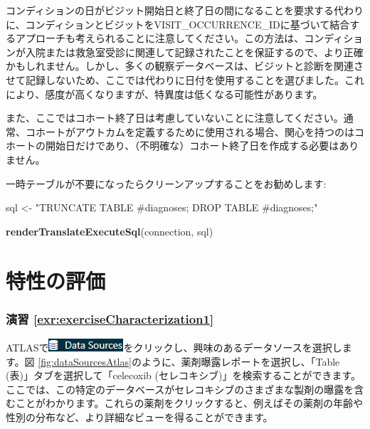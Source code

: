 \documentclass[
  11pt]{book}
\newenvironment{Shaded}{\begin{snugshade}}{\end{snugshade}}
\newcommand{\FunctionTok}[1]{\textcolor[rgb]{0.13,0.29,0.53}{\textbf{#1}}}
\newcommand{\NormalTok}[1]{#1}
\newcommand{\OtherTok}[1]{\textcolor[rgb]{0.56,0.35,0.01}{#1}}
\newcommand{\StringTok}[1]{\textcolor[rgb]{0.31,0.60,0.02}{#1}}
\theoremstyle{definition}
\theoremstyle{definition}
\theoremstyle{definition}
\theoremstyle{definition}
\theoremstyle{remark}
\begin{document}
コンディションの日がビジット開始日と終了日の間になることを要求する代わりに、コンディションとビジットをVISIT\_OCCURRENCE\_IDに基づいて結合するアプローチも考えられることに注意してください。この方法は、コンディションが入院または救急室受診に関連して記録されたことを保証するので、より正確かもしれません。しかし、多くの観察データベースは、ビジットと診断を関連させて記録しないため、ここでは代わりに日付を使用することを選びました。これにより、感度が高くなりますが、特異度は低くなる可能性があります。

また、ここではコホート終了日は考慮していないことに注意してください。通常、コホートがアウトカムを定義するために使用される場合、関心を持つのはコホートの開始日だけであり、（不明確な）コホート終了日を作成する必要はありません。

一時テーブルが不要になったらクリーンアップすることをお勧めします:

\begin{Shaded}
\begin{Highlighting}[]
\NormalTok{sql }\OtherTok{\textless{}{-}} \StringTok{"TRUNCATE TABLE \#diagnoses;}
\StringTok{DROP TABLE \#diagnoses;"}

\FunctionTok{renderTranslateExecuteSql}\NormalTok{(connection, sql)}
\end{Highlighting}
\end{Shaded}

\section{特性の評価}\label{Characterizationanswers}

\subsubsection*{演習 \ref{exr:exerciseCharacterization1}}\label{ux6f14ux7fd2-refexrexercisecharacterization1}

ATLASで\includegraphics{images/Characterization/atlasDataSourcesMenuItem.png}をクリックし、興味のあるデータソースを選択します。図 \ref{fig:dataSourcesAtlas}のように、薬剤曝露レポートを選択し、「Table (表)」タブを選択して「celecoxib (セレコキシブ)」を検索することができます。ここでは、この特定のデータベースがセレコキシブのさまざまな製剤の曝露を含むことがわかります。これらの薬剤をクリックすると、例えばその薬剤の年齢や性別の分布など、より詳細なビューを得ることができます。
\end{document}
